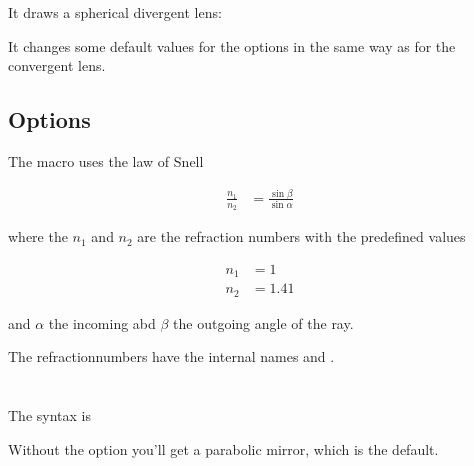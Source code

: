 \documentclass[11pt,english,BCOR10mm,DIV13,bibliography=totoc,parskip=false,smallheadings
    headexclude,footexclude,oneside]{pst-doc}
\begin{document}
\begin{BDef}
\end{BDef}

It draws a spherical divergent lens:

\begin{LTXexample}[wide=false]
\lensSPH[lensType=DVG,lensWidth=0.5]
\end{LTXexample}

It changes some default values for the options in the same way as for the convergent lens.


\subsection{Options}

The macro uses the law of Snell

\begin{align}
\frac{n_1}{n_2}&=\frac{\sin \beta}{\sin \alpha}
\end{align}

where the $n_1$ and $n_2$ are the refraction numbers with the predefined values 

\begin{align}
	n_1 &= 1 \\
	n_2 &= 1.41 
\end{align}

and $\alpha$ the incoming abd $\beta$ the outgoing angle of the ray.

The refractionnumbers have the internal names  and .

\clearpage

\section{}

The syntax is 

\begin{BDef}
\end{BDef}



\resetOpticOptions
\begin{LTXexample}[wide=false]
\mirrorCVG[mirrorType=SPH]
\end{LTXexample}

Without the option  you'll get a parabolic mirror, which is the default.
\end{document}

